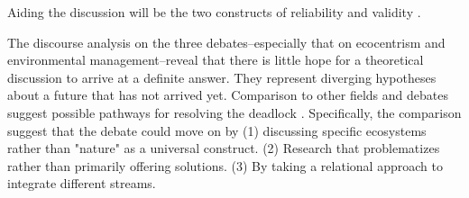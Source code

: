 \documentclass{article}
\begin{document}
	Aiding the discussion will be the two constructs of reliability and validity \citep{Rerup2021}.
	
	The discourse analysis on the three debates--especially that on ecocentrism and environmental management--reveal that there is little hope for a theoretical discussion to arrive at a definite answer. They represent diverging hypotheses about a future that has not arrived yet. Comparison to other fields and debates suggest possible pathways for resolving the deadlock \citep[cf.][]{Giddens1979a}. Specifically, the comparison suggest that the debate could move on by (1) discussing specific ecosystems rather than "nature" as a universal construct. (2) Research that problematizes rather than primarily offering solutions. (3) By taking a relational approach to integrate different streams.




	\clearpage
	
	
\end{document}
